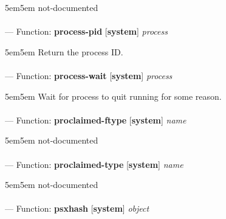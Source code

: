 \begin{adjustwidth}{5em}{5em}
not-documented
\end{adjustwidth}

\paragraph{}
\label{SYSTEM:PROCESS-PID}
--- Function: \textbf{process-pid} [\textbf{system}] \textit{process}

\begin{adjustwidth}{5em}{5em}
Return the process ID.
\end{adjustwidth}

\paragraph{}
\label{SYSTEM:PROCESS-WAIT}
--- Function: \textbf{process-wait} [\textbf{system}] \textit{process}

\begin{adjustwidth}{5em}{5em}
Wait for process to quit running for some reason.
\end{adjustwidth}

\paragraph{}
\label{SYSTEM:PROCLAIMED-FTYPE}
--- Function: \textbf{proclaimed-ftype} [\textbf{system}] \textit{name}

\begin{adjustwidth}{5em}{5em}
not-documented
\end{adjustwidth}

\paragraph{}
\label{SYSTEM:PROCLAIMED-TYPE}
--- Function: \textbf{proclaimed-type} [\textbf{system}] \textit{name}

\begin{adjustwidth}{5em}{5em}
not-documented
\end{adjustwidth}

\paragraph{}
\label{SYSTEM:PSXHASH}
--- Function: \textbf{psxhash} [\textbf{system}] \textit{object}


